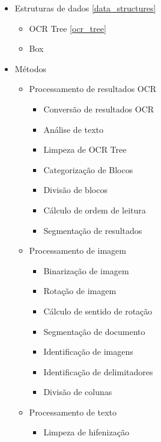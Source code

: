 \begin{itemize}\setlength\itemsep{0.05cm}
	\item Estruturas de dados \ref{data_structures}
	\begin{itemize}\setlength\itemsep{0.05cm}
		\item OCR Tree \ref{ocr_tree}
		\item Box
	\end{itemize}
	\item Métodos
	
	\begin{itemize}\setlength\itemsep{0.05cm}
		\item Processamento de resultados OCR
		
		\begin{itemize}\setlength\itemsep{0.05cm}
			\item Conversão de resultados OCR
			\item Análise de texto
			\item Limpeza de OCR Tree
			\item Categorização de Blocos
			\item Divisão de blocos
			\item Cálculo de ordem de leitura
			\item Segmentação de resultados 
		\end{itemize}
		
		\item Processamento de imagem
		\begin{itemize}\setlength\itemsep{0.05cm}
			\item Binarização de imagem
			\item Rotação de imagem
			\item Cálculo de sentido de rotação
			\item Segmentação de documento
			\item Identificação de imagens
			\item Identificação de delimitadores
			\item Divisão de colunas 
		\end{itemize}
		
		\item Processamento de texto
		\begin{itemize}\setlength\itemsep{0.05cm}
			\item Limpeza de hifenização
		\end{itemize}
		
	\end{itemize}
	
\end{itemize}


